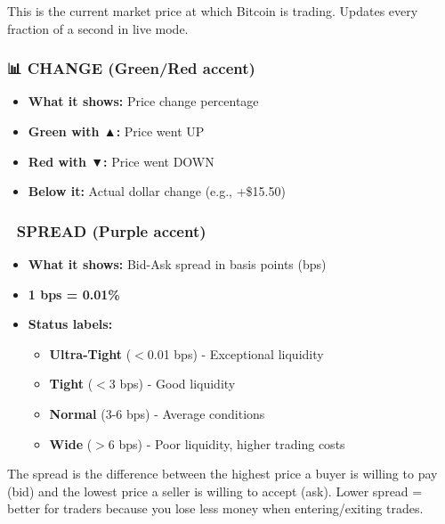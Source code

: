 \documentclass[12pt,a4paper]{article}
\begin{document}
\begin{tipbox}
This is the current market price at which Bitcoin is trading. Updates every fraction of a second in live mode.
\end{tipbox}

\subsubsection{📊 CHANGE (Green/Red accent)}
\begin{itemize}
    \item \textbf{What it shows:} Price change percentage
    \item \textbf{Green with ▲:} Price went UP
    \item \textbf{Red with ▼:} Price went DOWN
    \item \textbf{Below it:} Actual dollar change (e.g., +\$15.50)
\end{itemize}

\subsubsection{📏 SPREAD (Purple accent)}
\begin{itemize}
    \item \textbf{What it shows:} Bid-Ask spread in basis points (bps)
    \item \textbf{1 bps = 0.01\%}
    \item \textbf{Status labels:}
    \begin{itemize}
        \item \textbf{Ultra-Tight} ($<$0.01 bps) - Exceptional liquidity
        \item \textbf{Tight} ($<$3 bps) - Good liquidity
        \item \textbf{Normal} (3-6 bps) - Average conditions
        \item \textbf{Wide} ($>$6 bps) - Poor liquidity, higher trading costs
    \end{itemize}
\end{itemize}

\begin{importantbox}
The spread is the difference between the highest price a buyer is willing to pay (bid) and the lowest price a seller is willing to accept (ask). Lower spread = better for traders because you lose less money when entering/exiting trades.
\end{importantbox}
\end{document}
